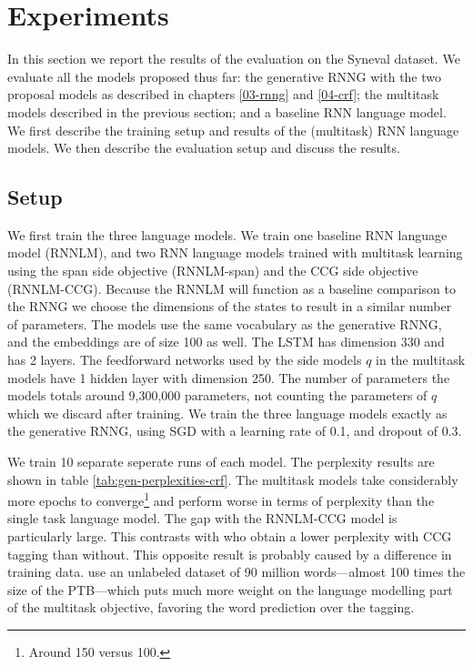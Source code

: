 \section{Experiments}
  In this section we report the results of the evaluation on the Syneval dataset. We evaluate all the models proposed thus far: the generative RNNG with the two proposal models as described in chapters \ref{03-rnng} and \ref{04-crf}; the multitask models described in the previous section; and a baseline RNN language model. We first describe the training setup and results of the (multitask) RNN language models. We then describe the evaluation setup and discuss the results.

  \subsection{Setup}
    We first train the three language models. We train one baseline RNN language model (RNNLM), and two RNN language models trained with multitask learning using the span side objective (RNNLM-span) and the CCG side objective (RNNLM-CCG). Because the RNNLM will function as a baseline comparison to the RNNG we choose the dimensions of the states to result in a similar number of parameters. The models use the same vocabulary as the generative RNNG, and the embeddings are of size 100 as well. The LSTM has dimension 330 and has 2 layers. The feedforward networks used by the side models $q$ in the multitask models have 1 hidden layer with dimension 250. The number of parameters the models totals around 9,300,000 parameters, not counting the parameters of $q$ which we discard after training. We train the three language models exactly as the generative RNNG, using SGD with a learning rate of 0.1, and dropout of 0.3.

    

    We train 10 separate seperate runs of each model. The perplexity results are shown in table \ref{tab:gen-perplexities-crf}. The multitask models take considerably more epochs to converge\footnote{Around 150 versus 100.} and perform worse in terms of perplexity than the single task language model. The gap with the RNNLM-CCG model is particularly large. This contrasts with \citet{linzen2018targeted} who obtain a lower perplexity with CCG tagging than without. This opposite result is probably caused by a difference in training data. \citet{linzen2018targeted} use an unlabeled dataset of 90 million words---almost 100 times the size of the PTB---which puts much more weight on the language modelling part of the multitask objective, favoring the word prediction over the tagging.

